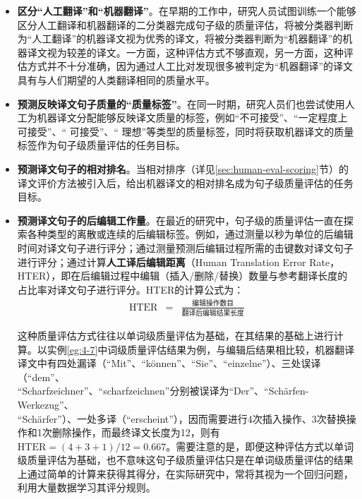 \begin{itemize}
\vspace{0.5em}
\item {\small\sffamily\bfseries{区分“人工翻译”和“机器翻译”}}。在早期的工作中，研究人员试图训练一个能够区分人工翻译和机器翻译的二分类器完成句子级的质量评估，将被分类器判断为“人工翻译”的机器译文视为优秀的译文，将被分类器判断为“机器翻译”的机器译文视为较差的译文。一方面，这种评估方式不够直观，另一方面，这种评估方式并不十分准确，因为通过人工比对发现很多被判定为“机器翻译”的译文具有与人们期望的人类翻译相同的质量水平。
\vspace{0.5em}
\item {\small\sffamily\bfseries{预测反映译文句子质量的“质量标签”}}。在同一时期，研究人员们也尝试使用人工为机器译文分配能够反映译文质量的标签，例如“不可接受”、“一定程度上可接受”、“ 可接受”、“ 理想”等类型的质量标签，同时将获取机器译文的质量标签作为句子级质量评估的任务目标。
\vspace{0.5em}
\item {\small\sffamily\bfseries{预测译文句子的相对排名}}。当相对排序（详见\ref{sec:human-eval-scoring}节）的译文评价方法被引入后，给出机器译文的相对排名成为句子级质量评估的任务目标。
\vspace{0.5em}
\item {\small\sffamily\bfseries{预测译文句子的后编辑工作量}}。在最近的研究中，句子级的质量评估一直在探索各种类型的离散或连续的后编辑标签。例如，通过测量以秒为单位的后编辑时间对译文句子进行评分；通过测量预测后编辑过程所需的击键数对译文句子进行评分；通过计算{\small\sffamily\bfseries{人工译后编辑距离}}（Human Translation Error Rate，HTER），即在后编辑过程中编辑（插入/删除/替换）数量与参考翻译长度的占比率对译文句子进行评分。HTER的计算公式为：
\vspace{0.5em}
\begin{eqnarray}
\textrm{HTER}&=& \frac{\mbox{编辑操作数目}}{\mbox{翻译后编辑结果长度}}
\label{eq:4-20}
\end{eqnarray}

\parinterval 这种质量评估方式往往以单词级质量评估为基础，在其结果的基础上进行计算。以实例\ref{eg:4-7}中词级质量评估结果为例，与编辑后结果相比较，机器翻译译文中有四处漏译（“Mit”、“können”、“Sie”、“einzelne”）、三处误译（“dem”、\\“Scharfzeichner”、“scharfzeichnen”分别被误译为“Der”、“Schärfen-Werkezug”、\\“Schärfer”）、一处多译（“erscheint”），因而需要进行4次插入操作、3次替换操作和1次删除操作，而最终译文长度为12，则有${\textrm {HTER}}=(4+3+1)/12=0.667$。需要注意的是，即便这种评估方式以单词级质量评估为基础，也不意味这句子级质量评估只是在单词级质量评估的结果上通过简单的计算来获得其得分，在实际研究中，常将其视为一个回归问题，利用大量数据学习其评分规则。
\vspace{0.5em}
\end{itemize}

